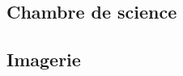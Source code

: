 \subsection{Chambre de science}
\subsection{Imagerie}




\begin{comment}






Confidence judgments in one's decision are considered a central example of metacognition. How can we access to the subjective sense of confidence of someone else ? In this chapter, I will review to different behavioral measures to obtain this sense of confidence in humans and in animals. In a second part, I will present the experiment I performed, in collaboration with Jean-R\'emy Martin and J\'er\^ome Sackur at ENS, during my PhD. 


\section{How to measure confidence experimentally ?}



\subsection{In Humans} %


\end{comment}
